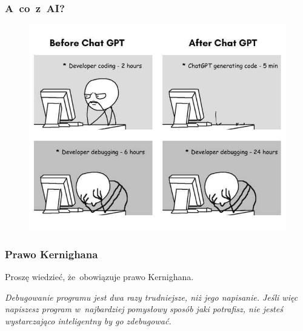 \documentclass[10pt,t]{beamer}
\begin{document}
\begin{frame}
  \frametitle{A~co~z~AI?}


  \begin{figure}

    \label{fig:Impact-of-ChatGPT-One-view}

    \centering


    \includegraphics[scale=0.4]
    {./Presentations-pictures/Impact-of-ChatGPT-One-view.jpg}

  \end{figure}

\end{frame}





\begin{frame}
  \frametitle{Prawo Kernighana}


  Proszę wiedzieć, że~obowiązuje prawo Kernighana.

  \textit{Debugowanie programu jest dwa razy trudniejsze, niż jego
    napisanie. Jeśli więc napiszesz program w~najbardziej pomysłowy sposób
    jaki potrafisz, nie jesteś wystarczająco inteligentny by go zdebugować.}







\end{frame}
\end{document}
